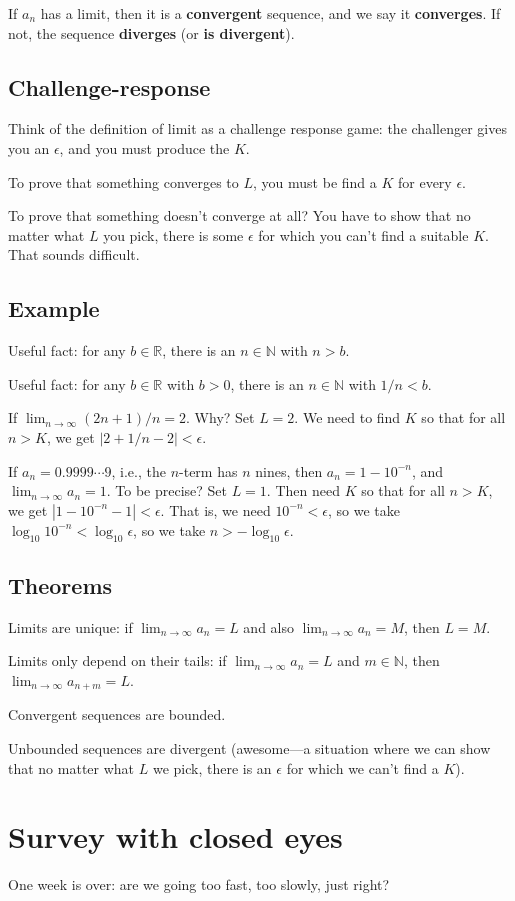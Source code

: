 \documentclass[12pt]{article}
\newcommand{\N}{\mathbb{N}}
\newcommand{\R}{\mathbb{R}}
\begin{document}
If $a_n$ has a limit, then it is a \textbf{convergent} sequence, and
we say it \textbf{converges}.  If not, the sequence \textbf{diverges}
(or \textbf{is divergent}).

\subsection{Challenge-response}

Think of the definition of limit as a challenge response game: the
challenger gives you an $\epsilon$, and you must produce the $K$.

To prove that something converges to $L$, you must be find a $K$ for
every $\epsilon$.

To prove that something doesn't converge at all?  You have to show
that no matter what $L$ you pick, there is some $\epsilon$ for which
you can't find a suitable $K$.  That sounds difficult.

\subsection{Example}

Useful fact: for any $b \in \R$, there is an $n \in \N$ with $n > b$.

Useful fact: for any $b \in \R$ with $b > 0$, there is an $n \in \N$
with $1/n < b$.

If $\lim_{n \to \infty} (2n+1)/n = 2$.  Why?  Set $L = 2$.  We need to find $K$ so that for all $n > K$, we get $|2 + 1/n - 2| < \epsilon$.

If $a_n = 0.9999 \cdots 9$, i.e., the $n$-term has $n$ nines, then
$a_n = 1 - 10^{-n}$, and $\lim_{n \to \infty} a_n = 1$.  To be
precise?  Set $L = 1$.  Then need $K$ so that for all $n > K$, we get
$|1 - 10^{-n} - 1| < \epsilon$.  That is, we need $10^{-n} <
\epsilon$, so we take $\log_{10} 10^{-n} < \log_{10} \epsilon$, so we
take $n > -\log_{10} \epsilon$.

\subsection{Theorems}

Limits are unique: if $\lim_{n \to \infty} a_n = L$ and also $\lim_{n
  \to \infty} a_n = M$, then $L = M$.

Limits only depend on their tails: if $\lim_{n \to \infty} a_n = L$
and $m \in \N$, then $\lim_{n \to \infty} a_{n+m} = L$.

Convergent sequences are bounded.

Unbounded sequences are divergent (awesome---a situation where we can
show that no matter what $L$ we pick, there is an $\epsilon$ for which
we can't find a $K$).

\section{Survey with closed eyes}

One week is over: are we going too fast, too slowly, just right?
\end{document}
